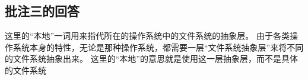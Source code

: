 
\subsection{批注三的回答}
\label{sec:fix:bl3}

这里的“本地”一词用来指代所在的操作系统中的文件系统的抽象层。
由于各类操作系统本身的特性，无论是那种操作系统，都需要一层“文件系统抽象层”来将不同的文件系统抽象出来。
这里的“本地”的意思就是使用这一层抽象层，而不是具体的文件系统